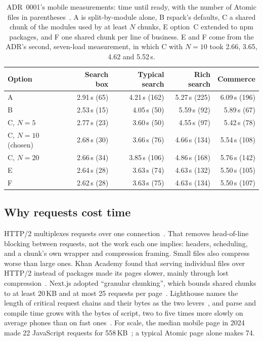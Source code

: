 \documentclass[11pt]{article}
\begin{document}
\begin{table}[t]
\centering\small
\caption{ADR~0001's mobile measurements: time until ready, with the number of Atomic files in parentheses~\cite{adr0001}. A is split-by-module alone, B rspack's defaults, C a shared chunk of the modules used by at least $N$ chunks, E option~C extended to npm packages, and F one shared chunk per line of business. E and F come from the ADR's second, seven-load measurement, in which C with $N = 10$ took 2.66, 3.65, 4.62 and 5.52\,s.}
\label{tab:adr}
\begin{tabular}{lrrrr}
\toprule
Option & Search box & Typical search & Rich search & Commerce\\
\midrule
A & 2.91\,s (65) & 4.21\,s (162) & 5.27\,s (225) & 6.09\,s (196)\\
B & 2.53\,s (15) & 4.05\,s (50) & 5.59\,s (92) & 5.89\,s (67)\\
C, $N = 5$ & 2.77\,s (23) & 3.60\,s (50) & 4.55\,s (97) & 5.42\,s (78)\\
C, $N = 10$ (chosen) & 2.68\,s (30) & 3.66\,s (76) & 4.66\,s (134) & 5.54\,s (108)\\
C, $N = 20$ & 2.66\,s (34) & 3.85\,s (106) & 4.86\,s (168) & 5.76\,s (142)\\
E & 2.64\,s (28) & 3.63\,s (74) & 4.63\,s (132) & 5.50\,s (105)\\
F & 2.62\,s (28) & 3.63\,s (75) & 4.63\,s (134) & 5.50\,s (107)\\
\bottomrule
\end{tabular}
\end{table}

\subsection{Why requests cost time}
HTTP/2 multiplexes requests over one connection~\cite{rfc9113}. That removes head-of-line blocking between requests, not the work each one implies: headers, scheduling, and a chunk's own wrapper and compression framing. Small files also compress worse than large ones. Khan Academy found that serving individual files over HTTP/2 instead of packages made its pages slower, mainly through lost compression~\cite{silverstein2015}. Next.js adopted ``granular chunking'', which bounds shared chunks to at least 20\,KB and at most 25 requests per page~\cite{djirdeh-granular}. Lighthouse names the length of critical request chains and their bytes as the two levers~\cite{lighthouse-crc}, and parse and compile time grows with the bytes of script, two to five times more slowly on average phones than on fast ones~\cite{osmani-startup}. For scale, the median mobile page in 2024 made 22 JavaScript requests for 558\,KB~\cite{almanac2024}; a typical Atomic page alone makes 74.
\end{document}
